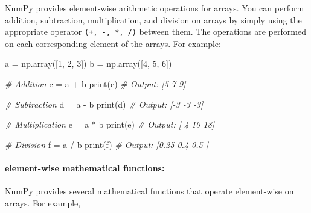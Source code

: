 \documentclass[11pt]{article}
\newenvironment{Shaded}{}{}
\newcommand{\DecValTok}[1]{\textcolor[rgb]{0.25,0.63,0.44}{{#1}}}
\newcommand{\CommentTok}[1]{\textcolor[rgb]{0.38,0.63,0.69}{\textit{{#1}}}}
\newcommand{\NormalTok}[1]{{#1}}
\newcommand{\OperatorTok}[1]{\textcolor[rgb]{0.40,0.40,0.40}{{#1}}}
\newcommand{\BuiltInTok}[1]{{#1}}
\begin{document}
NumPy provides element-wise arithmetic operations for arrays. You can
perform addition, subtraction, multiplication, and division on arrays by
simply using the appropriate operator \texttt{(+,\ -,\ *,\ /)} between
them. The operations are performed on each corresponding element of the
arrays. For example:

\begin{Shaded}
\begin{Highlighting}[]

\NormalTok{a }\OperatorTok{=}\NormalTok{ np.array([}\DecValTok{1}\NormalTok{, }\DecValTok{2}\NormalTok{, }\DecValTok{3}\NormalTok{])}
\NormalTok{b }\OperatorTok{=}\NormalTok{ np.array([}\DecValTok{4}\NormalTok{, }\DecValTok{5}\NormalTok{, }\DecValTok{6}\NormalTok{])}

\CommentTok{\# Addition}
\NormalTok{c }\OperatorTok{=}\NormalTok{ a }\OperatorTok{+}\NormalTok{ b}
\BuiltInTok{print}\NormalTok{(c)  }\CommentTok{\# Output: [5 7 9]}

\CommentTok{\# Subtraction}
\NormalTok{d }\OperatorTok{=}\NormalTok{ a }\OperatorTok{{-}}\NormalTok{ b}
\BuiltInTok{print}\NormalTok{(d)  }\CommentTok{\# Output: [{-}3 {-}3 {-}3]}

\CommentTok{\# Multiplication}
\NormalTok{e }\OperatorTok{=}\NormalTok{ a }\OperatorTok{*}\NormalTok{ b}
\BuiltInTok{print}\NormalTok{(e)  }\CommentTok{\# Output: [ 4 10 18]}

\CommentTok{\# Division}
\NormalTok{f }\OperatorTok{=}\NormalTok{ a }\OperatorTok{/}\NormalTok{ b}
\BuiltInTok{print}\NormalTok{(f)  }\CommentTok{\# Output: [0.25 0.4  0.5 ]}
\end{Highlighting}
\end{Shaded}

\hypertarget{element-wise-mathematical-functions}{%
\paragraph{element-wise mathematical
functions:}\label{element-wise-mathematical-functions}}

NumPy provides several mathematical functions that operate element-wise
on arrays. For example,
\end{document}
